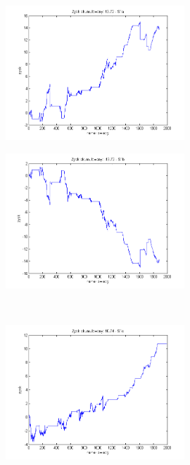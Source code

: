 \documentclass{tewiart}
\begin{document}
\FloatBarrier
\begin{figure}[h]
\centering
\begin{minipage}{\linewidth}
\centering
\includegraphics[width=0.6\textwidth]{images/nzdjpyS1a.png}
\label{jedno}
\end{minipage}
\begin{minipage}{\linewidth}
\centering
\includegraphics[width=0.6\textwidth]{images/nzdjpyS1b.png}
\label{dwu}
\end{minipage}
\\
\begin{minipage}{\linewidth}
\centering
\includegraphics[width=0.6\textwidth]{images/nzdjpyS1c.png}
\label{cztero}
\end{minipage}

\end{figure}
\end{document}
